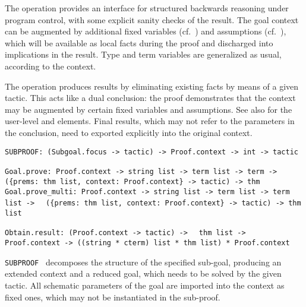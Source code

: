 \begin{isabellebody}
\begin{isamarkuptext}
  The  operation provides an interface for structured
  backwards reasoning under program control, with some explicit sanity
  checks of the result.  The goal context can be augmented by
  additional fixed variables (cf.\ ) and
  assumptions (cf.\ ), which will be available
  as local facts during the proof and discharged into implications in
  the result.  Type and term variables are generalized as usual,
  according to the context.

  The  operation produces results by eliminating
  existing facts by means of a given tactic.  This acts like a dual
  conclusion: the proof demonstrates that the context may be augmented
  by certain fixed variables and assumptions.  See also
  \cite{isabelle-isar-ref} for the user-level \isa{{\isasymOBTAIN}} and
  \isa{{\isasymGUESS}} elements.  Final results, which may not refer to
  the parameters in the conclusion, need to exported explicitly into
  the original context.%
\end{isamarkuptext}%
\isamarkuptrue%
%
\isadelimmlref
%
\endisadelimmlref
%
\isatagmlref
%
\begin{isamarkuptext}%
\begin{mldecls}
  \verb|SUBPROOF: (Subgoal.focus -> tactic) -> Proof.context -> int -> tactic| \\
  \end{mldecls}
  \begin{mldecls}
  \verb|Goal.prove: Proof.context -> string list -> term list -> term ->|\isasep\isanewline%
\verb|  ({prems: thm list, context: Proof.context} -> tactic) -> thm| \\
  \verb|Goal.prove_multi: Proof.context -> string list -> term list -> term list ->|\isasep\isanewline%
\verb|  ({prems: thm list, context: Proof.context} -> tactic) -> thm list| \\
  \end{mldecls}
  \begin{mldecls}
  \verb|Obtain.result: (Proof.context -> tactic) ->|\isasep\isanewline%
\verb|  thm list -> Proof.context -> ((string * cterm) list * thm list) * Proof.context| \\
  \end{mldecls}

  \begin{description}

  \item \verb|SUBPROOF|~ decomposes the structure
  of the specified sub-goal, producing an extended context and a
  reduced goal, which needs to be solved by the given tactic.  All
  schematic parameters of the goal are imported into the context as
  fixed ones, which may not be instantiated in the sub-proof.


\end{description}
\end{isamarkuptext}
\end{isabellebody}
